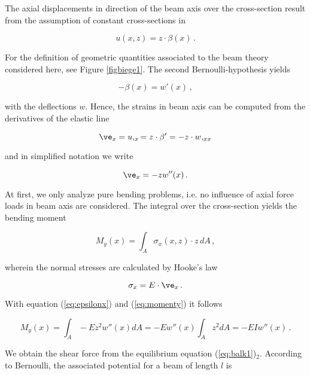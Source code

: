 The axial displacements in direction of the beam axis over 
the cross-section result from the assumption of constant 
cross-sections in

\begin{equation}
u(x,z) = z \cdot \beta(x) \, .
\end{equation}

For the definition of geometric quantities associated to 
the beam theory considered here, see Figure \ref{figbiege1}. 
The second Bernoulli-hypothesis yields

\begin{equation}
- \beta(x) = w'(x) \, ,
\end{equation}

with the deflections $w$. 
Hence, the strains in beam axis can be computed from the 
derivatives of the elastic line 

\begin{equation}
\ve_x = u,_x = z \cdot \beta' = - z \cdot w,_{xx}
\end{equation}

and in simplified notation we write 

\begin{equation}
\ve_x = - z w''(x) \, .
\label{eq:epsilonx}
\end{equation}

At first, we only analyze pure bending problems, i.e. 
no influence of axial force loads in beam axis are considered. 
The integral over the cross-section yields the bending moment 

\begin{equation}
M_y (x) = \int_{A} \sigma_x (x,z) \cdot z \, dA \, ,
\label{eq:momenty}
\end{equation}

wherein the normal stresses are calculated by Hooke's law

\begin{equation}
\sigma_x = E \cdot \ve_x \, .
\end{equation}

With equation (\ref{eq:epsilonx}) and (\ref{eq:momenty}) 
it follows

\begin{equation}
M_y (x) = \int_A - E z^2 w''(x) d A = - E w''(x) \int_A z^2 dA = -EI
w''(x) \, .
\label{eq:myw''}
\end{equation}

We obtain the shear force from the equilibrium equation 
(\ref{eq:balk1})${}_2$.
According to Bernoulli, the associated potential for a 
beam of length $l$ is

